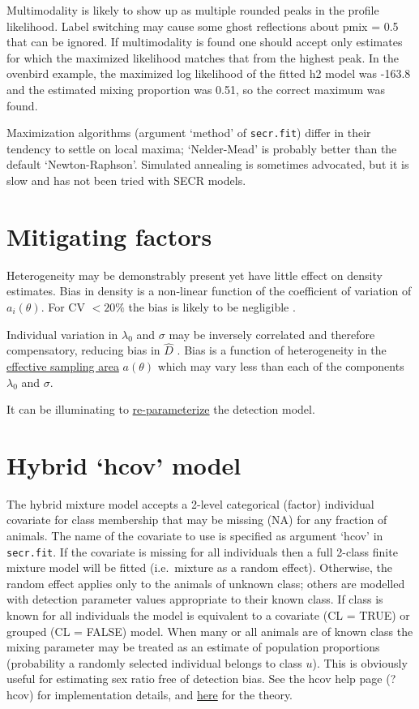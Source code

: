 \documentclass[
]{book}
\begin{document}
Multimodality is likely to show up as multiple rounded peaks in the profile likelihood. Label switching may cause
some ghost reflections about pmix = 0.5 that can be ignored. If multimodality is found one should accept only estimates for which the maximized likelihood matches that from the highest peak. In the ovenbird example, the maximized log likelihood of the fitted h2 model was -163.8 and the estimated mixing proportion was 0.51, so the correct maximum was found.

Maximization algorithms (argument `method' of \texttt{secr.fit}) differ in their tendency to settle on local maxima; `Nelder-Mead' is probably better than the default `Newton-Raphson'. Simulated annealing is sometimes advocated, but it is slow and has not been tried with SECR models.

\section{Mitigating factors}\label{mitigation}

Heterogeneity may be demonstrably present yet have little effect on density estimates. Bias in density is a non-linear function of the coefficient of variation of \(a_i(\theta)\). For CV \(<20\%\) the bias is likely to be negligible \citep{em14}.

Individual variation in \(\lambda_0\) and \(\sigma\) may be inversely correlated and therefore compensatory, reducing bias in \(\hat D\) \citep{em14}. Bias is a function of heterogeneity in the \hyperref[esa]{effective sampling area} \(a(\theta)\) which may vary less than each of the components \(\lambda_0\) and \(\sigma\).

It can be illuminating to \hyperref[parameterizations]{re-parameterize} the detection model.

\section{Hybrid `hcov' model}\label{hybrid-hcov-model}


The hybrid mixture model accepts a 2-level categorical (factor) individual covariate for class membership that may be missing (NA) for any fraction of animals. The name of the covariate to use is specified as argument `hcov' in \texttt{secr.fit}. If the covariate is missing for all individuals then a full 2-class finite mixture model will be fitted (i.e.~mixture as a random effect). Otherwise, the random effect applies only to the animals of unknown class; others are modelled with detection parameter values appropriate to their known class. If class is known for all individuals the model is equivalent to a covariate (CL = TRUE) or grouped (CL = FALSE) model. When many or all animals are of known class the mixing parameter may be treated as an estimate of population proportions (probability a randomly selected individual belongs to class \(u\)). This is obviously useful for estimating sex ratio free of detection bias. See the hcov help page (?hcov) for implementation details, and \hyperref[hybrid-mixtures]{here} for the theory.
\end{document}
